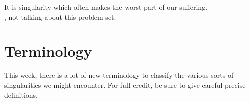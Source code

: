 \documentclass{homework}
\author{Alex Li}
\begin{document}
\maketitle

\begin{inspiration}
It is singularity which often makes the worst part of our suffering.\\
, not talking about this problem set.
\end{inspiration}

\section{Terminology}

This week, there is a lot of new terminology to classify the various
sorts of singularities we might encounter.  For full credit, be sure
to give careful precise definitions.
\end{document}
